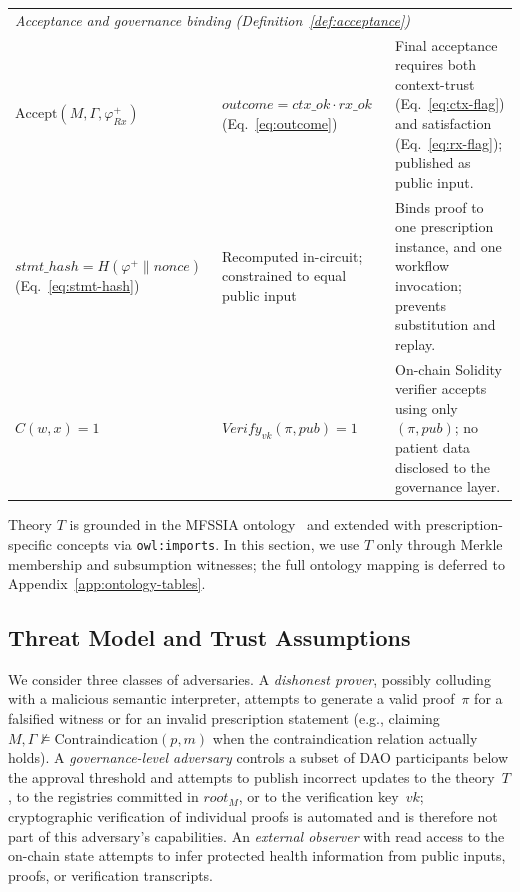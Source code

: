 \documentclass[journal]{IEEEtran}
\begin{document}
\begin{table}[!t]
\begin{tabular}{p{3.8cm} p{4.2cm} p{5.5cm}}
\midrule
\multicolumn{3}{l}{\textit{Acceptance and governance binding (Definition~\ref{def:acceptance})}} \\
$\mathrm{Accept}(M, \Gamma, \varphi^{+}_{Rx})$ &
  $\mathit{outcome} = \mathit{ctx\_ok} \cdot \mathit{rx\_ok}$\; (Eq.~\ref{eq:outcome}) &
  Final acceptance requires both context-trust (Eq.~\ref{eq:ctx-flag}) and satisfaction (Eq.~\ref{eq:rx-flag}); published as public input. \\
$\mathit{stmt\_hash} = H(\varphi^{+} \| \mathit{nonce})$\; (Eq.~\ref{eq:stmt-hash}) &
  Recomputed in-circuit; constrained to equal public input &
  Binds proof to one prescription instance, and one workflow invocation; prevents substitution and replay. \\
$C(w, x) = 1$ &
  $\mathit{Verify}_{\mathit{vk}}(\pi, \mathit{pub}) = 1$ &
  On-chain Solidity verifier accepts using only $(\pi, \mathit{pub})$; no patient data disclosed to the governance layer. \\
\bottomrule
\end{tabular}
\end{table}

Theory $T$ is grounded in the MFSSIA ontology~\cite{kormiltsyn2026mfssia} and extended with prescription-specific concepts via \texttt{owl:imports}. In this section, we use $T$ only through Merkle membership and subsumption witnesses; the full ontology mapping is deferred to Appendix~\ref{app:ontology-tables}.

\subsection{Threat Model and Trust Assumptions}
\label{ss:threat-model}

We consider three classes of adversaries.
A \emph{dishonest prover}, possibly colluding with a malicious
semantic interpreter, attempts to generate a valid proof~$\pi$
for a falsified witness or for an invalid prescription statement
(e.g., claiming
$M,\Gamma \not\models \mathrm{Contraindication}(p,m)$
when the contraindication relation actually holds).
A \emph{governance-level adversary} controls a subset of DAO
participants below the approval threshold and attempts to
publish incorrect updates to the theory~$T$, to the registries
committed in $\mathit{root}_M$,
or to the verification key~$\mathit{vk}$; cryptographic
verification of individual proofs is automated and is therefore
not part of this adversary's capabilities.
An \emph{external observer} with read access to the on-chain
state attempts to infer protected health information from
public inputs, proofs, or verification transcripts.
\end{document}
